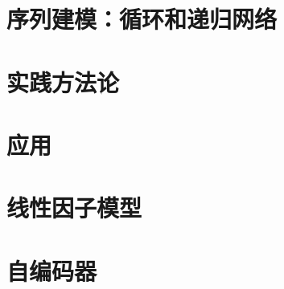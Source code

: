 \chapter{序列建模：循环和递归网络}












\chapter{实践方法论}






\chapter{应用}





\chapter{线性因子模型}





\chapter{自编码器}









